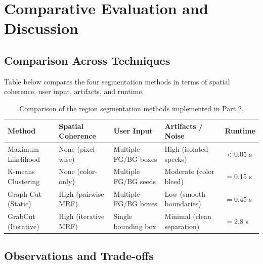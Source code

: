 \documentclass[11pt,a4paper]{article}
\begin{document}
\section{Comparative Evaluation and Discussion}

\subsection{Comparison Across Techniques}

Table below compares the four segmentation methods in terms of spatial coherence, user input, artifacts, and runtime.

\begin{table}[H]
\centering
\small
\setlength{\tabcolsep}{4pt}
\renewcommand{\arraystretch}{1.2}

\begin{tabularx}{\linewidth}{@{}l
>{\centering\arraybackslash}X
>{\centering\arraybackslash}X
>{\centering\arraybackslash}X
>{\centering\arraybackslash}X@{}}
\toprule
\textbf{Method} & \textbf{Spatial Coherence} & \textbf{User Input} &
\textbf{Artifacts / Noise} & \textbf{Runtime} \\
\midrule
Maximum Likelihood & None (pixel-wise) & Multiple FG/BG boxes &
High (isolated specks) & $<0.05$ s \\

K-means Clustering & None (color-only) & Multiple FG/BG seeds &
Moderate (color bleed) & $= 0.15$ s \\

Graph Cut (Static) & High (pairwise MRF) & Multiple FG/BG boxes &
Low (smooth boundaries) & $= 0.45$ s \\

GrabCut (Iterative) & High (iterative MRF) & Single bounding box &
Minimal (clean separation) & $= 2.8$ s \\
\bottomrule
\end{tabularx}

\caption{Comparison of the region segmentation methods implemented in Part 2.}
\label{tab:comparison}
\end{table}

\subsection{Observations and Trade-offs}
\end{document}
